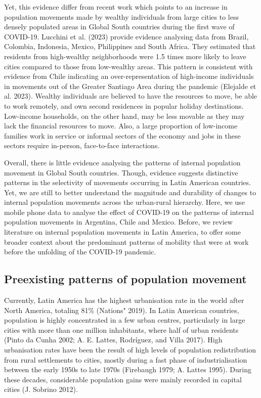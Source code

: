 \documentclass[
  11pt,
]{article}
\begin{document}
Yet, this evidence differ from recent work which points to an increase
in population movements made by wealthy individuals from large cities to
less densely populated areas in Global South countries during the first
wave of COVID-19. Lucchini et al. (2023) provide evidence analysing data
from Brazil, Colombia, Indonesia, Mexico, Philippines and South Africa.
They estimated that residents from high-wealthy neighborhoods were 1.5
times more likely to leave cities compared to those from low-wealthy
areas. This pattern is consistent with evidence from Chile indicating an
over-representation of high-income individuals in movements out of the
Greater Santiago Area during the pandemic (Elejalde et al. 2023).
Wealthy individuals are believed to have the resources to move, be able
to work remotely, and own second residences in popular holiday
destinations. Low-income households, on the other hand, may be less
movable as they may lack the financial resources to move. Also, a large
proportion of low-income families work in service or informal sectors of
the economy and jobs in these sectors require in-person, face-to-face
interactions.

Overall, there is little evidence analysing the patterns of internal
population movement in Global South countries. Though, evidence suggests
distinctive patterns in the selectivity of movements occurring in Latin
American countries. Yet, we are still to better understand the magnitude
and durability of changes to internal population movements across the
urban-rural hierarchy. Here, we use mobile phone data to analyse the
effect of COVID-19 on the patterns of internal population movements in
Argentina, Chile and Mexico. Before, we review literature on internal
population movements in Latin America, to offer some broader context
about the predominant patterns of mobility that were at work before the
unfolding of the COVID-19 pandemic.

\hypertarget{preexisting-patterns-of-population-movement}{%
\subsection{Preexisting patterns of population
movement}\label{preexisting-patterns-of-population-movement}}

Currently, Latin America has the highest urbanisation rate in the world
after North America, totaling 81\% (Nations" 2019). In Latin American
countries, population is highly concentrated in a few urban centres,
particularly in large cities with more than one million inhabitants,
where half of urban residents (Pinto da Cunha 2002; A. E. Lattes,
Rodríguez, and Villa 2017). High urbanisation rates have been the result
of high levels of population redistribution from rural settlements to
cities, mostly during a fast phase of industrialisation between the
early 1950s to late 1970s (Firebaugh 1979; A. Lattes 1995). During these
decades, considerable population gains were mainly recorded in capital
cities (J. Sobrino 2012).
\end{document}
